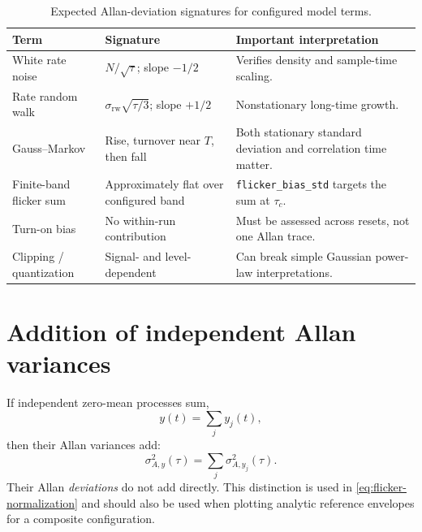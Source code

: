\documentclass[11pt,oneside,headings=big]{scrreprt}
\newcommand{\field}[1]{\texttt{#1}}
\begin{document}
    \begin{table}[htbp]
        \centering
        \caption{Expected Allan-deviation signatures for configured model terms.}
        \label{tab:allan-signatures}
        \begin{tabularx}{\textwidth}{@{}L{1.55in}L{1.65in}Y@{}}
\toprule
\textbf{Term} & \textbf{Signature} & \textbf{Important interpretation} \\
\midrule
White rate noise & $N/\sqrt\tau$; slope $-1/2$ & Verifies density and sample-time scaling. \\
Rate random walk & $\sigma_{\mathrm{rw}}\sqrt{\tau/3}$; slope $+1/2$ & Nonstationary long-time growth. \\
Gauss--Markov & Rise, turnover near $T$, then fall & Both stationary standard deviation and correlation time matter. \\
Finite-band flicker sum & Approximately flat over configured band & \field{flicker\_bias\_std} targets the sum at $\tau_c$. \\
Turn-on bias & No within-run contribution & Must be assessed across resets, not one Allan trace. \\
Clipping / quantization & Signal- and level-dependent & Can break simple Gaussian power-law interpretations. \\
\bottomrule
        \end{tabularx}
    \end{table}


    \section{Addition of independent Allan variances}
    If independent zero-mean processes sum,
    \begin{equation}
        y(t)=\sum_j y_j(t),
    \end{equation}
    then their Allan variances add:
    \begin{equation}
        \sigma_{A,y}^2(\tau)=\sum_j\sigma_{A,y_j}^2(\tau).
        \label{eq:allan-addition}
    \end{equation}
    Their Allan \emph{deviations} do not add directly. This distinction is used in
    \cref{eq:flicker-normalization} and should also be used when plotting analytic
    reference envelopes for a composite configuration.
\end{document}
